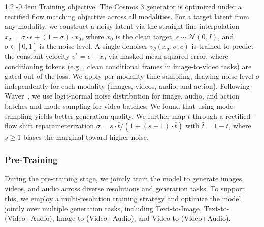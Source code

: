 \documentclass{llmxive}
\makeatletter
\providecommand{\eg}{e.g.,\xspace}
\providecommand{\paragraph}{  \@startsection{paragraph}{4}{\z@}    {1\baselineskip \@plus .2\baselineskip}    {-0.4em}    {\normalfont\normalsize\bfseries}}
\makeatother
\begin{document}
\paragraph{Training objective.} The Cosmos 3 generator is optimized under a rectified flow matching objective across all modalities. For a target latent from any modality, we construct a noisy latent via the straight-line interpolation $x_\sigma = \sigma \cdot \epsilon + (1 - \sigma) \cdot x_0$, where $x_0$ is the clean target, $\epsilon \sim \mathcal{N}(0, I)$, and $\sigma \in [0, 1]$ is the noise level. A single denoiser $v_\theta(x_\sigma, \sigma, c)$ is trained to predict the constant velocity $v^* = \epsilon - x_0$ via masked mean-squared error, where conditioning tokens (\eg, clean conditional frames in image-to-video tasks) are gated out of the loss.
We apply per-modality time sampling, drawing noise level $\sigma$ independently for each modality (images, videos, audio, and action).
Following Waver~\citep{waver}, we use logit-normal noise distribution for image, audio, and action batches and mode sampling for video batches. We found that using mode sampling yields better generation quality. We further map $t$ through a rectified-flow shift reparameterization $\sigma = s \cdot \bar{t} / (1 + (s-1) \cdot \bar{t})$ with $\bar{t} = 1 - t$, where $s \geq 1$ biases the marginal toward higher noise. 

\subsubsection{Pre-Training}

During the pre-training stage, we jointly train the model to generate images, videos, and audio across diverse resolutions and generation tasks. To support this, we employ a multi-resolution training strategy and optimize the model jointly over multiple generation tasks, including Text-to-Image, Text-to-(Video+Audio), Image-to-(Video+Audio), and Video-to-(Video+Audio).
\end{document}
